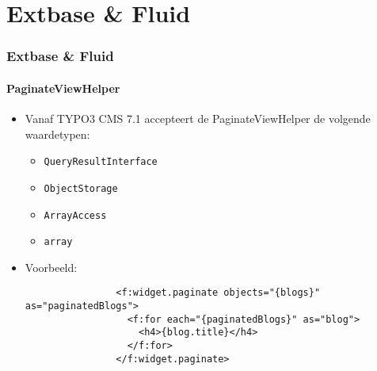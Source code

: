 %

\section{Extbase \& Fluid}


\begin{frame}[fragile]
	\frametitle{Extbase \& Fluid}
	\framesubtitle{PaginateViewHelper}

	\begin{itemize}

		\item Vanaf TYPO3 CMS 7.1 accepteert de PaginateViewHelper de volgende waardetypen:

			\begin{itemize}
				\item \texttt{QueryResultInterface}
				\item \texttt{ObjectStorage}
				\item \texttt{ArrayAccess}
				\item \texttt{array}
			\end{itemize}

		\item Voorbeeld:

			\begin{lstlisting}
				<f:widget.paginate objects="{blogs}" as="paginatedBlogs">
				  <f:for each="{paginatedBlogs}" as="blog">
				    <h4>{blog.title}</h4>
				  </f:for>
				</f:widget.paginate>
			\end{lstlisting}

	\end{itemize}

\end{frame}

